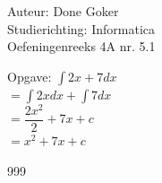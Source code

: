 \documentclass[a4paper]{article}
\begin{document}
  
\noindent \large Auteur: Done Goker \\
\noindent \large Studierichting: Informatica\\
\noindent \large Oefeningenreeks 4A nr. 5.1\\

\medskip

\normalsize

Opgave:
$\displaystyle\int 2x + 7 dx$ \\

$= \displaystyle\int 2xdx + \displaystyle\int 7 dx$ \\

$= \dfrac{2x^2}{2} + 7x +c$\\

$= x^2 + 7x +c$


\begin{thebibliography}{999}
\end{thebibliography}
\end{document}
